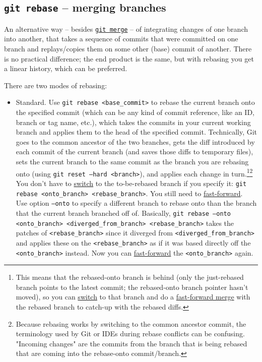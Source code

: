 \documentclass[table, xcdraw]{article}%
\begin{document}
\subsection{\texttt{git rebase} -- merging branches} \label{rebase}

An alternative way -- besides \hyperref[merge]{\texttt{git merge}} -- of integrating changes of one branch into another, that takes a sequence of commits that were committed on one branch and replays/copies them on some other (base) commit of another. There is no practical difference; the end product is the same, but with rebasing you get a linear history, which can be preferred.

There are two modes of rebasing:

\begin{itemize}
    \item Standard. Use \texttt{git rebase <base_commit>} to rebase the current branch onto the specified commit (which can be any kind of commit reference, like an ID, branch or tag name, etc.), which takes the commits in your current working branch and applies them to the head of the specified commit. Technically, Git goes to the common ancestor of the two branches, gets the diff introduced by each commit of the current branch (and saves those diffs to temporary files), sets the current branch to the same commit as the branch you are rebasing onto (using \texttt{git reset --hard <branch>}), and applies each change in turn.\footnote{This means that the rebased-onto branch is behind (only the just-rebased branch points to the latest commit; the rebased-onto branch pointer hasn't moved), so you can \hyperref[checkout]{switch} to that branch and do a \hyperref[merge]{fast-forward merge} with the rebased branch to catch-up with the rebased diffs.}\footnote{Because rebasing works by switching to the common ancestor commit, the terminology used by Git or IDEs during rebase conflicts can be confusing. "Incoming changes" are the commits from the branch that is being rebased that are coming into the rebase-onto commit/branch.}\\
    You don't have to \hyperref[checkout]{switch} to the to-be-rebased branch if you specify it: \texttt{git rebase <onto_branch> <rebase_branch>}. You still need to \hyperref[merge]{fast-forward}.\\
    Use option \texttt{--onto} to specify a different branch to rebase onto than the branch that the current branch branched off of. Basically, \texttt{git rebase --onto <onto_branch> <diverged_from_branch> <rebase_branch>} takes the patches of \texttt{<rebase_branch>} since it diverged from \texttt{<diverged_from_branch>} and applies these on the \texttt{<rebase_branch>} as if it was based directly off the \texttt{<onto_branch>} instead. Now you can \hyperref[merge]{fast-forward} the \texttt{<onto_branch>} again.

\end{itemize}
\end{document}
